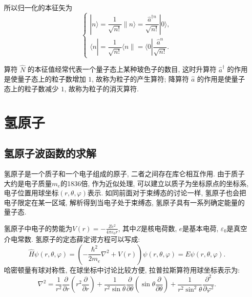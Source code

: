 所以归一化的本征矢为
\[
\begin{cases}
|n\rangle
=
\dfrac{1}{\sqrt{n!}}\|n\rangle
=
\dfrac{\hat{a}^{\dagger n}}{\sqrt{n!}}|0\rangle,
\\[8pt]
\langle n|
=
\dfrac{1}{\sqrt{n!}}\langle n\|
=
\langle 0|\dfrac{\hat{a}^{n}}{\sqrt{n!}}.
\end{cases}
\]

算符 $\hat{N}$ 的本征值经常代表一个量子态上某种玻色子的数目,
这时升算符 $\hat{a}^{\dagger}$ 的作用是使量子态上的粒子数增加 $1$,
故称为粒子的产生算符;
降算符 $\hat{a}$ 的作用是使量子态上的粒子数减少 $1$,
故称为粒子的消灭算符.

\section{氢原子}
\subsection{氢原子波函数的求解}
氢原子是一个质子和一个电子组成的原子, 二者之间存在库仑相互作用. 由于质子大约是电子质量$m_e$的1836倍, 作为近似处理, 可以建立以质子为坐标原点的坐标系, 电子位置用球坐标$(r, \theta, \varphi)$表示. 如同前面对于束缚态的讨论一样, 氢原子也会把电子限定在某一区域, 解析得到当电子处于束缚态, 氢原子具有一系列确定能量的量子态.

氢原子中电子的势能为$V(r)=-\frac{Ze^2}{4\pi\varepsilon_0 r}$, 其中$Z$是核电荷数, $e$是基本电荷, $\varepsilon_0$是真空介电常数. 氢原子的定态薛定谔方程可以写成:
\[
\hat{H}\psi(r, \theta, \varphi) = \left(-\frac{\hbar^2}{2m_e}\nabla^2 + V(r)\right)\psi(r, \theta, \varphi) = E\psi(r, \theta, \varphi).
\]
哈密顿量有球对称性, 在球坐标中讨论比较方便, 拉普拉斯算符用球坐标表示为:
\[
\nabla^2 = \frac{1}{r^2}\frac{\partial}{\partial r}\left(r^2\frac{\partial}{\partial r}\right) + \frac{1}{r^2\sin\theta}\frac{\partial}{\partial \theta}\left(\sin\theta\frac{\partial}{\partial \theta}\right) + \frac{1}{r^2\sin^2\theta}\frac{\partial^2}{\partial \varphi^2}.
\]

